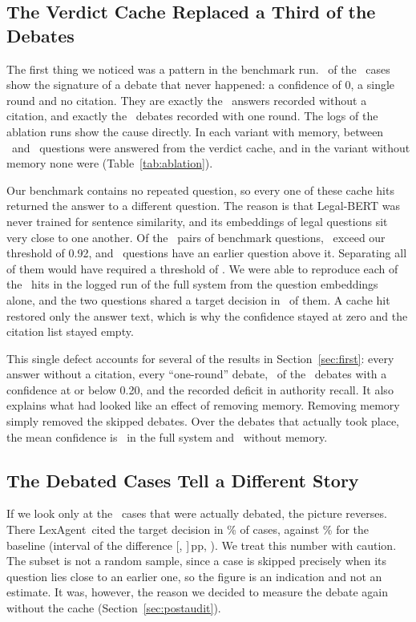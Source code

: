 \documentclass[conference]{IEEEtran}
\newcommand{\sys}{LexAgent}
\newcommand{\pp}{\,pp}
\begin{document}
\subsection{The Verdict Cache Replaced a Third of the Debates}
The first thing we noticed was a pattern in the benchmark run. \ResAudCacheBench\ of the \ResTestCases\ cases show the signature of a debate that never happened: a confidence of 0, a single round and no citation. They are exactly the \ResLexNoCiteAnswers\ answers recorded without a citation, and exactly the \ResLexRoundsOne\ debates recorded with one round. The logs of the ablation runs show the cause directly. In each variant with memory, between \ResAudCacheAblMin\ and \ResAudCacheAblMax\ questions were answered from the verdict cache, and in the variant without memory none were (Table~\ref{tab:ablation}).

Our benchmark contains no repeated question, so every one of these cache hits returned the answer to a different question. The reason is that Legal-BERT was never trained for sentence similarity, and its embeddings of legal questions sit very close to one another. Of the \ResAudCollisionPairsTotal\ pairs of benchmark questions, \ResAudCollisionPairs\ exceed our threshold of 0.92, and \ResAudCollisionQuestions\ questions have an earlier question above it. Separating all of them would have required a threshold of \ResAudNoCollisionThreshold. We were able to reproduce each of the \ResAudCacheAblFull\ hits in the logged run of the full system from the question embeddings alone, and the two questions shared a target decision in \ResAudCacheSameTarget\ of them. A cache hit restored only the answer text, which is why the confidence stayed at zero and the citation list stayed empty.

This single defect accounts for several of the results in Section~\ref{sec:first}: every answer without a citation, every ``one-round'' debate, \ResAudCacheBench\ of the \ResLexConfLow\ debates with a confidence at or below 0.20, and the recorded deficit in authority recall. It also explains what had looked like an effect of removing memory. Removing memory simply removed the skipped debates. Over the debates that actually took place, the mean confidence is \ResAudImpliedConfFull\ in the full system and \ResAudImpliedConfAThree\ without memory.

\subsection{The Debated Cases Tell a Different Story}
If we look only at the \ResAudDebated\ cases that were actually debated, the picture reverses. There \sys\ cited the target decision in \ResAudDebatedLexAR\% of cases, against \ResAudDebatedBaseAR\% for the baseline (interval of the difference [\ResAudDebatedARLow, \ResAudDebatedARHigh]\pp, \ResAudDebatedARP). We treat this number with caution. The subset is not a random sample, since a case is skipped precisely when its question lies close to an earlier one, so the figure is an indication and not an estimate. It was, however, the reason we decided to measure the debate again without the cache (Section~\ref{sec:postaudit}).
\end{document}
